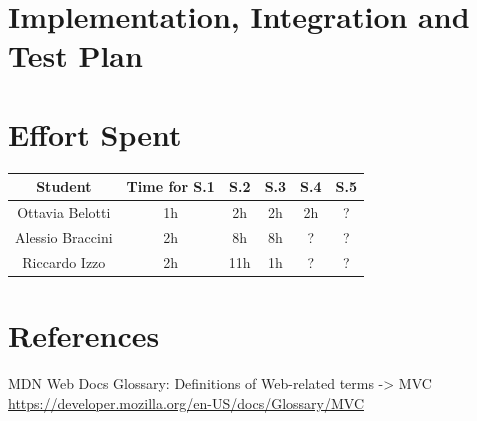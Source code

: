 \documentclass[table, 12pt]{article}
\begin{document}
\section{Implementation, Integration and Test Plan}

\newpage
\section{Effort Spent}
    \begin{tabular}{| c || c | c| c| c |c|}
        \hline
        Student & Time for S.1 & S.2 & S.3 & S.4 & S.5\\ \hline
        Ottavia Belotti & 1h & 2h & 2h & 2h & ? \\
        Alessio Braccini & 2h & 8h & 8h & ?  & ? \\
        Riccardo Izzo & 2h & 11h & 1h & ?  & ? \\
        \hline
    \end{tabular}


\section{References}


\begin{thebibliography}{9}
    MDN Web Docs Glossary: Definitions of Web-related terms -> MVC
    \url{https://developer.mozilla.org/en-US/docs/Glossary/MVC}
    
\end{thebibliography}
\end{document}
